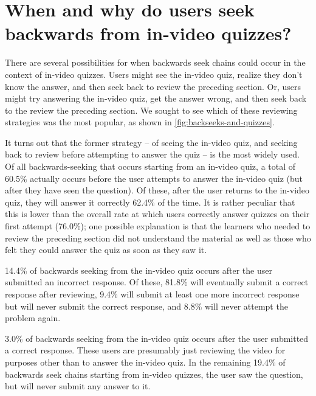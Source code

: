 \documentclass{sigchi}
\begin{document}

\section{When and why do users seek backwards from in-video quizzes?}

There are several possibilities for when backwards seek chains could occur in the context of in-video quizzes. Users might see the in-video quiz, realize they don't know the answer, and then seek back to review the preceding section. Or, users might try answering the in-video quiz, get the answer wrong, and then seek back to the review the preceding section. We sought to see which of these reviewing strategies was the most popular, as shown in \autoref{fig:backseeks-and-quizzes}.

It turns out that the former strategy -- of seeing the in-video quiz, and seeking back to review before attempting to answer the quiz -- is the most widely used. Of all backwards-seeking that occurs starting from an in-video quiz, a total of 60.5\% actually occurs before the user attempts to answer the in-video quiz (but after they have seen the question). Of these, after the user returns to the in-video quiz, they will answer it correctly 62.4\% of the time. It is rather peculiar that this is lower than the overall rate at which users correctly answer quizzes on their first attempt (76.0\%); one possible explanation is that the learners who needed to review the preceding section did not understand the material as well as those who felt they could answer the quiz as soon as they saw it.

14.4\% of backwards seeking from the in-video quiz occurs after the user submitted an incorrect response. Of these, 81.8\% will eventually submit a correct response after reviewing, 9.4\% will submit at least one more incorrect response but will never submit the correct response, and 8.8\% will never attempt the problem again.

3.0\% of backwards seeking from the in-video quiz occurs after the user submitted a correct response. These users are presumably just reviewing the video for purposes other than to answer the in-video quiz. In the remaining 19.4\% of backwards seek chains starting from in-video quizzes, the user saw the question, but will never submit any answer to it.
\end{document}
